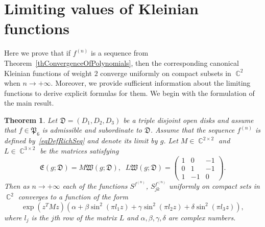 \documentclass{amsart}
\numberwithin{equation}{section}
\newtheorem{theorem}{Theorem}[section]
\theoremstyle{definition}
\theoremstyle{remark}
\DeclareMathOperator{\CC}{\mathbb C}
\begin{document}
	\section{Limiting values of Kleinian functions}\label{sec:Limit}
	Here we prove that if $f^{(n)}$ is a sequence from Theorem~\ref{thConvergenceOfPolynomials}, then the corresponding canonical Kleinian functions of weight $2$ converge uniformly on compact subsets in $\CC^2$ when $n \to +\infty$. Moreover, we provide sufficient information about the limiting functions to derive explicit formulas for them. We begin with the formulation of the main result.
	
	\begin{theorem}\label{thPassingToTheLimit}
		Let $\mathfrak D = (D_1,D_2,D_3)$ be a triple disjoint open disks and assume that $f \in \mathfrak P_6$ is admissible and subordinate to $\mathfrak D$. Assume that the sequence $f^{(n)}$ is defined by~\eqref{eqDefRichSeq} and denote its limit by $g$. Let $M \in \CC^{2\times 2}$ and $L \in \CC^{3 \times 2}$ be the matrices satisfying
		\[
		\mathfrak E(g;\mathfrak D) = M \mathfrak W(g;\mathfrak D),\;\;L\mathfrak W(g;\mathfrak D) = \begin{pmatrix}
			1 & 0 & -1 \\
			0 & 1 & -1 \\
			1 & -1 & 0 
		\end{pmatrix}.
		\]
		Then as $n \to +\infty$ each of the functions $S^{f^{(n)}}$, $S_{jk}^{f^{(n)}}$ uniformly on compact sets in $\CC^2$ converges to a function of the form
		\[
		\exp(z^TMz)\left(\alpha + \beta \sin^2(\pi l_1z) + \gamma\sin^2(\pi l_2z) + \delta\sin^2(\pi l_3z)\right),
		\]
		where $l_j$ is the $j$th row of the matrix $L$ and $\alpha,\beta,\gamma,\delta$ are complex numbers.
	\end{theorem}
	
\end{document}
